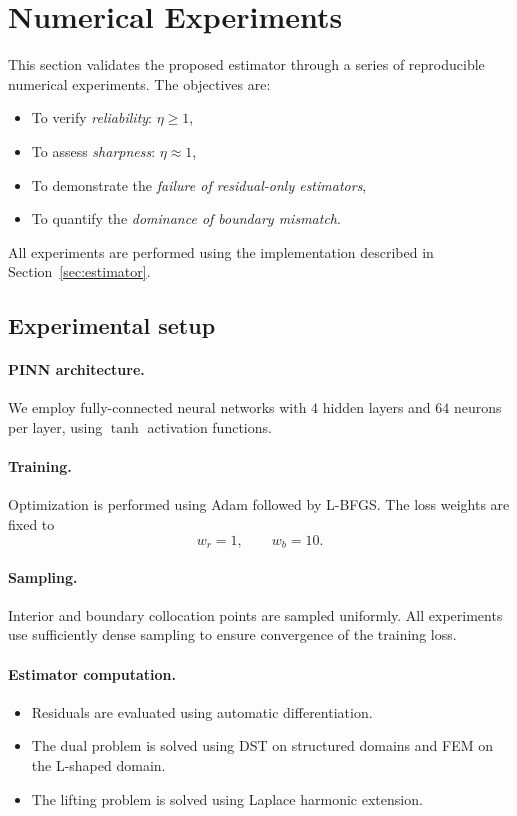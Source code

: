 \section{Numerical Experiments}\label{sec:experiments}

This section validates the proposed estimator through a series of
reproducible numerical experiments. The objectives are:

\begin{itemize}
\item To verify \emph{reliability}: $\eta \ge 1$,
\item To assess \emph{sharpness}: $\eta \approx 1$,
\item To demonstrate the \emph{failure of residual-only estimators},
\item To quantify the \emph{dominance of boundary mismatch}.
\end{itemize}

All experiments are performed using the implementation described in
Section~\ref{sec:estimator}.

\subsection{Experimental setup}

\paragraph{PINN architecture.}
We employ fully-connected neural networks with $4$ hidden layers and
$64$ neurons per layer, using $\tanh$ activation functions.

\paragraph{Training.}
Optimization is performed using Adam followed by L-BFGS.
The loss weights are fixed to
\[
w_r = 1, \qquad w_b = 10.
\]

\paragraph{Sampling.}
Interior and boundary collocation points are sampled uniformly.
All experiments use sufficiently dense sampling to ensure convergence
of the training loss.

\paragraph{Estimator computation.}
\begin{itemize}
\item Residuals are evaluated using automatic differentiation.
\item The dual problem is solved using DST on structured domains
and FEM on the L-shaped domain.
\item The lifting problem is solved using Laplace harmonic extension.
\end{itemize}

